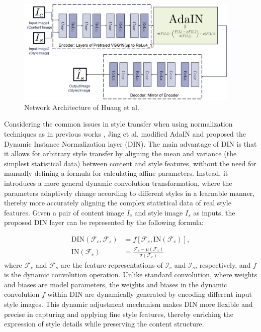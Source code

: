 \begin{figure}[!htbp]%
    \centering%
    \includegraphics[width=0.95\textwidth]{fig/Figure_8_Network_Architecture_of_Huang_et_al_[4].pdf}
    \caption{Network Architecture of Huang et al.\citep{04huang2017arbitrary}}\label{fig8_Chen}
\end{figure}

Considering the common issues in style transfer when using normalization techniques as in previous works \citep{04huang2017arbitrary,39dumoulin2016learned}, Jing et al.\citep{41jing2020dynamic} modified AdaIN\citep{04huang2017arbitrary} and proposed the Dynamic Instance Normalization layer (DIN). The main advantage of DIN is that it allows for arbitrary style transfer by aligning the mean and variance (the simplest statistical data) between content and style features, without the need for manually defining a formula for calculating affine parameters. Instead, it introduces a more general dynamic convolution transformation, where the parameters adaptively change according to different styles in a learnable manner, thereby more accurately aligning the complex statistical data of real style features. Given a pair of content image $I_c$ and style image $I_s$ as inputs, the proposed DIN layer can be represented by the following formula:

\begin{equation}
    \begin{aligned}
        \text{DIN}(\mathcal{F}_c,\mathcal{F}_s) &= f[\mathcal{F}_s,\text{IN}(\mathcal{F}_c)],\\
        \text{IN}(\mathcal{F}_c) &= \frac{\mathcal{F}_c-\mu(\mathcal{F}_c)}{\sigma(\mathcal{F}_c)}
    \end{aligned}
\end{equation}
where $\mathcal{F}_c$ and $\mathcal{F}_s$ are the feature representations of $\mathcal{I}_c$ and $\mathcal{I}_s$, respectively, and $f$ is the dynamic convolution operation\citep{42jia2016dynamic}. Unlike standard convolution, where weights and biases are model parameters, the weights and biases in the dynamic convolution $f$ within DIN are dynamically generated by encoding different input style images. This dynamic adjustment mechanism makes DIN more flexible and precise in capturing and applying fine style features, thereby enriching the expression of style details while preserving the content structure.

